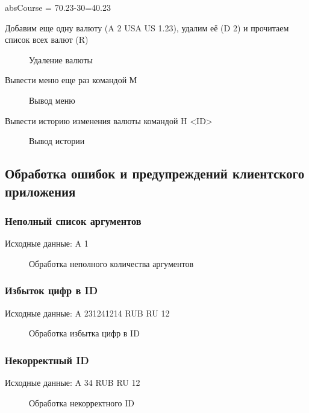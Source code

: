 \documentclass[a4paper,14pt]{article}
\begin{document}
absCourse = 70.23-30=40.23

\newpage
Добавим еще одну валюту (A 2 USA US 1.23), удалим её (D 2) и прочитаем список всех валют (R)
\begin{figure}[h!]
	\noindent\centering{
		\texttt{[image: 7]}}
	\caption{Удаление валюты}
	\label{figCurves}
\end{figure}
\newpage

Вывести меню еще раз командой М

\begin{figure}[h!]
	\noindent\centering{
		\texttt{[image: 8]}}
	\caption{Вывод меню}
	\label{figCurves}
\end{figure}

Вывести историю изменения валюты командой H <ID>

\begin{figure}[h!]
	\noindent\centering{
		\texttt{[image: 9]}}
	\caption{Вывод истории}
	\label{figCurves}
\end{figure}

\subsection {Обработка ошибок и предупреждений клиентского приложения}

\subsubsection {Неполный список аргументов}
Исходные данные: A 1

\begin{figure}[h!]
	\noindent\centering{
		\texttt{[image: 15]}}
	\caption{Обработка неполного количества аргументов}
	\label{figCurves}
\end{figure}

\subsubsection {Избыток цифр в ID}
Исходные данные: A 231241214 RUB RU 12
\begin{figure}[h!]
	\noindent\centering{
		\texttt{[image: 16]}}
	\caption{Обработка избытка цифр в ID}
	\label{figCurves}
\end{figure}

\subsubsection {Некорректный ID}
Исходные данные: A 34 RUB RU 12
\begin{figure}[h!]
	\noindent\centering{
		\texttt{[image: 17]}}
	\caption{Обработка некорректного ID}
	\label{figCurves}
\end{figure}
\end{document}
